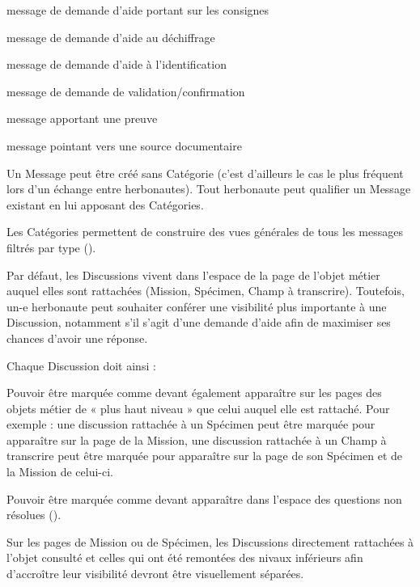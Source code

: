\startitemize
\item message de demande d'aide portant sur les consignes
\item message de demande d'aide au déchiffrage
\item message de demande d'aide à l'identification
\item message de demande de validation/confirmation
\item message apportant une preuve
\item message pointant vers une source documentaire
\stopitemize

Un Message peut être créé sans Catégorie (c'est d'ailleurs le cas le plus fréquent lors d'un échange entre herbonautes). Tout herbonaute peut qualifier un Message existant en lui apposant des Catégories.

Les Catégories permettent de construire des vues générales de tous les messages filtrés par type ().

\startsubsection[title={Accroître la visibilité d'une Discussion},reference:disc:vis]

Par défaut, les Discussions vivent dans l'espace de la page de l'objet métier auquel elles sont rattachées (Mission, Spécimen, Champ à transcrire).
Toutefois, un-e herbonaute peut souhaiter conférer une visibilité plus importante à une Discussion, notamment s'il s'agit d'une demande d'aide afin de maximiser ses chances d'avoir une réponse.

Chaque Discussion doit ainsi :

\startitemize
\item Pouvoir être marquée comme devant également apparaître sur les pages des objets métier de « plus haut niveau » que celui auquel elle est rattaché. Pour exemple : une discussion rattachée à un Spécimen peut être marquée pour apparaître sur la page de la Mission, une discussion rattachée à un Champ à transcrire peut être marquée pour apparaître sur la page de son Spécimen et de la Mission de celui-ci.
\item Pouvoir être marquée comme devant apparaître dans l'espace des questions non résolues ().
\stopitemize

Sur les pages de Mission ou de Spécimen, les Discussions directement rattachées à l'objet consulté et celles qui ont été remontées des nivaux inférieurs afin d'accroître leur visibilité devront être visuellement séparées.

